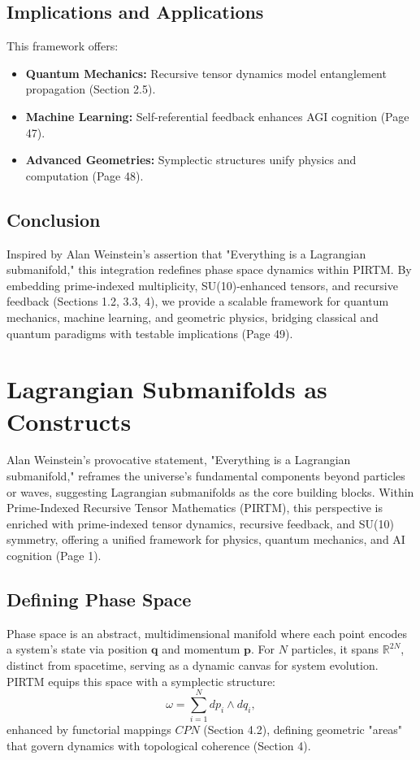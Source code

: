 \documentclass{article}
\theoremstyle{plain}
\begin{document}
\subsection{Implications and Applications}
This framework offers:
\begin{itemize}
    \item \textbf{Quantum Mechanics:} Recursive tensor dynamics model entanglement propagation (Section 2.5).
    \item \textbf{Machine Learning:} Self-referential feedback enhances AGI cognition (Page 47).
    \item \textbf{Advanced Geometries:} Symplectic structures unify physics and computation (Page 48).
\end{itemize}

\subsection{Conclusion}
Inspired by Alan Weinstein’s assertion that "Everything is a Lagrangian submanifold," this integration redefines phase space dynamics within PIRTM. By embedding prime-indexed multiplicity, SU(10)-enhanced tensors, and recursive feedback (Sections 1.2, 3.3, 4), we provide a scalable framework for quantum mechanics, machine learning, and geometric physics, bridging classical and quantum paradigms with testable implications (Page 49).


\section{Lagrangian Submanifolds as Constructs}

Alan Weinstein’s provocative statement, "Everything is a Lagrangian submanifold," reframes the universe’s fundamental components beyond particles or waves, suggesting Lagrangian submanifolds as the core building blocks. Within Prime-Indexed Recursive Tensor Mathematics (PIRTM), this perspective is enriched with prime-indexed tensor dynamics, recursive feedback, and SU(10) symmetry, offering a unified framework for physics, quantum mechanics, and AI cognition (Page 1).

\subsection{Defining Phase Space}

Phase space is an abstract, multidimensional manifold where each point encodes a system’s state via position \( \bm{q} \) and momentum \( \bm{p} \). For \( N \) particles, it spans \( \mathbb{R}^{2N} \), distinct from spacetime, serving as a dynamic canvas for system evolution. PIRTM equips this space with a symplectic structure:
\begin{equation}
\omega = \sum_{i=1}^N dp_i \wedge dq_i,
\end{equation}
enhanced by functorial mappings \( CPN \) (Section 4.2), defining geometric "areas" that govern dynamics with topological coherence (Section 4).
\end{document}
